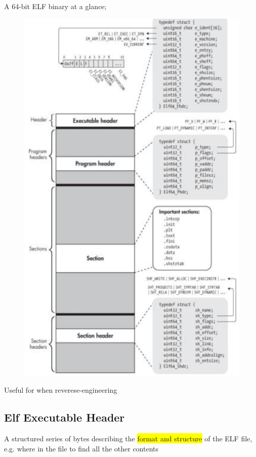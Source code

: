 \documentclass[]{project_plan}
\begin{document}
A 64-bit ELF binary at a glance;
\begin{figure}[H]
  \centering
  \includegraphics[width=.8\linewidth]{elf_binary_format.png}
\end{figure}

Useful for when reverese-engineering

\subsection{Elf Executable Header}
A structured series of bytes describing the \colorbox{yellow}{format and structure} of the ELF
file, e.g. where in the file to find all the other contents
\end{document}
